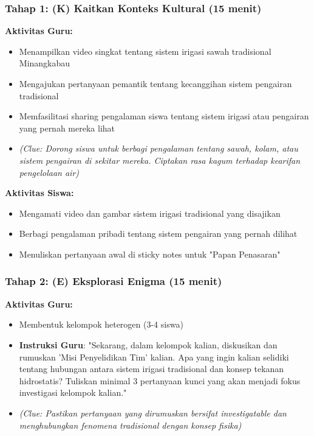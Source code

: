 \documentclass[12pt,a4paper]{article}
\begin{document}
\subsubsection{Tahap 1: (K) Kaitkan Konteks Kultural (15 menit)}

\textbf{Aktivitas Guru:}
\begin{itemize}
\item Menampilkan video singkat tentang sistem irigasi sawah tradisional Minangkabau
\item Mengajukan pertanyaan pemantik tentang kecanggihan sistem pengairan tradisional
\item Memfasilitasi sharing pengalaman siswa tentang sistem irigasi atau pengairan yang pernah mereka lihat
\item \textit{(Clue: Dorong siswa untuk berbagi pengalaman tentang sawah, kolam, atau sistem pengairan di sekitar mereka. Ciptakan rasa kagum terhadap kearifan pengelolaan air)}
\end{itemize}

\textbf{Aktivitas Siswa:}
\begin{itemize}
\item Mengamati video dan gambar sistem irigasi tradisional yang disajikan
\item Berbagi pengalaman pribadi tentang sistem pengairan yang pernah dilihat
\item Menuliskan pertanyaan awal di sticky notes untuk "Papan Penasaran"
\end{itemize}

\subsubsection{Tahap 2: (E) Eksplorasi Enigma (15 menit)}

\textbf{Aktivitas Guru:}
\begin{itemize}
\item Membentuk kelompok heterogen (3-4 siswa)
\item \textbf{Instruksi Guru}: "Sekarang, dalam kelompok kalian, diskusikan dan rumuskan 'Misi Penyelidikan Tim' kalian. Apa yang ingin kalian selidiki tentang hubungan antara sistem irigasi tradisional dan konsep tekanan hidrostatis? Tuliskan minimal 3 pertanyaan kunci yang akan menjadi fokus investigasi kelompok kalian."
\item \textit{(Clue: Pastikan pertanyaan yang dirumuskan bersifat investigatable dan menghubungkan fenomena tradisional dengan konsep fisika)}
\end{itemize}
\end{document}
